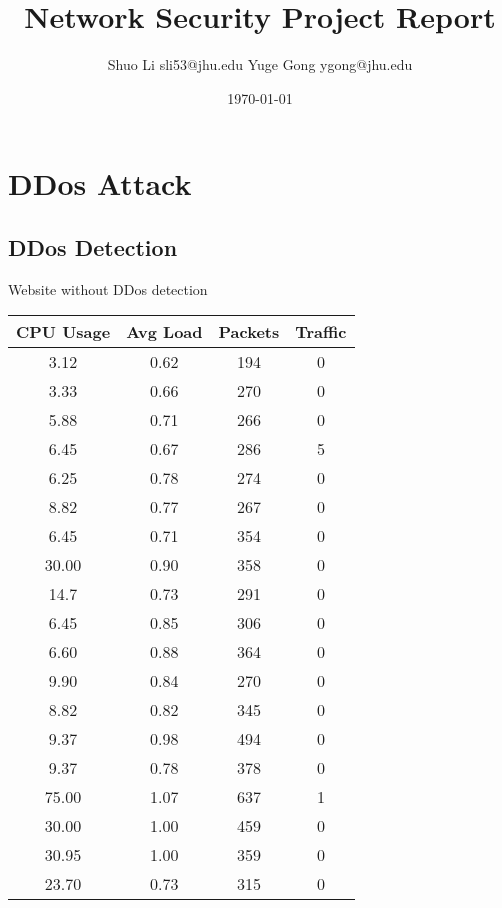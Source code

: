 \documentclass[12pt]{article}
\begin{document}
\title{Network Security Project Report}
\author{Shuo Li sli53@jhu.edu Yuge Gong ygong@jhu.edu}
\date{\today}
\maketitle
\section{DDos Attack}

\subsection{DDos Detection}

\makeatletter{}\makeatother
\begin{minipage}{.60\textwidth}
\centering
\caption{Website without DDos detection}
\begin{tabular}{|c|c|c|c|}
\hline
  CPU Usage & Avg Load & Packets & Traffic
 \\
  \hline
  3.12 & 0.62 & 194 & 0 \\
  3.33 & 0.66 & 270 & 0\\
  5.88 & 0.71 & 266 & 0\\
  6.45 & 0.67 & 286 & 5\\
  6.25 & 0.78 & 274 & 0\\
  8.82 & 0.77 & 267 & 0\\
  6.45 & 0.71 & 354 & 0\\
 30.00 & 0.90 & 358 & 0\\
  14.7 & 0.73 & 291 & 0\\
  6.45 & 0.85 & 306 & 0\\
  6.60 & 0.88 & 364 & 0\\
  9.90 & 0.84 & 270 & 0\\
  8.82 & 0.82 & 345 & 0\\
  9.37 & 0.98 & 494 & 0\\
  9.37 & 0.78 & 378 & 0\\
 75.00 & 1.07 & 637 & 1\\
 30.00 & 1.00 & 459 & 0\\
 30.95 & 1.00 & 359 & 0\\
 23.70 & 0.73 & 315 & 0\\
    \hline
\end{tabular}
\end{minipage}
\makeatletter{}\makeatother
\end{document}
